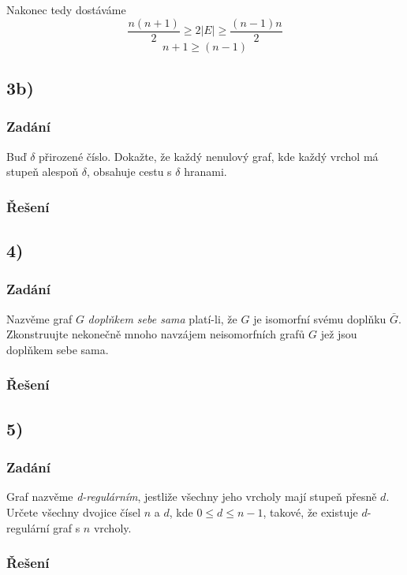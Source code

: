 \documentclass[../main.tex]{subfiles}
\begin{document}
Nakonec tedy dostáváme 
\begin{equation*}
    \frac{n(n+1)}{2} \geq 2|E| \geq \frac{(n-1)n}{2}
\end{equation*}
\begin{equation*}
    n+1 \geq (n-1)
\end{equation*}


\subsection*{3b)}
\subsubsection*{Zadání}
Buď $\delta$ přirozené číslo. Dokažte, že každý nenulový graf, kde každý vrchol má stupeň alespoň $\delta$, obsahuje cestu s $\delta$ hranami.
\subsubsection*{Řešení}


\subsection*{4)}
\subsubsection*{Zadání}
Nazvěme graf $G$ \textit{doplňkem sebe sama} platí-li, že $G$ je isomorfní svému doplňku $\bar{G}$. 
Zkonstruujte nekonečně mnoho navzájem neisomorfních grafů $G$ jež jsou doplňkem sebe sama.
\subsubsection*{Řešení}



\subsection*{5)}
\subsubsection*{Zadání}
Graf nazvěme \textit{d-regulárním}, jestliže všechny jeho vrcholy mají stupeň přesně $d$. 
Určete všechny dvojice čísel $n$ a $d$, kde $0\leq d\leq n-1$, takové, že existuje $d$-regulární graf s $n$ vrcholy.
\subsubsection*{Řešení}
\end{document}
